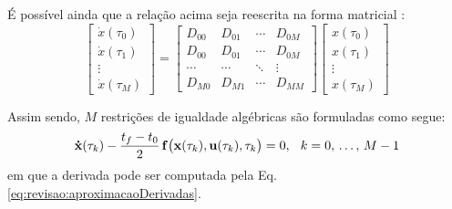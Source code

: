 É possível ainda que a relação acima seja reescrita na forma matricial \cite{becerra_tutorial_2010}:
%
\begin{equation}
	\begin{bmatrix}
		\dot{x}(\tau_0) \\
		\dot{x}(\tau_1) \\
		\vdots \\
		\dot{x}(\tau_M) 
	\end{bmatrix} = 
	\begin{bmatrix}
		D_{00} & D_{01} & \cdots & D_{0M} \\
		D_{00} & D_{01} & \cdots & D_{0M} \\
		\cdots & \cdots & \ddots & \vdots \\
		D_{M0} & D_{M1} & \cdots & D_{MM} 
	\end{bmatrix}
	\begin{bmatrix}
		x(\tau_0) \\
		x(\tau_1) \\
		\vdots \\
		x(\tau_M) 
	\end{bmatrix}
\end{equation}

Assim sendo, $ M $ restrições de igualdade algébricas são formuladas como segue:
%
\begin{equation}
\mathbf{\dot{x}}(\tau_k) - \frac{t_f - t_0}{2} \, \mathbf{f} \big( \mathbf{x}(\tau_k), \mathbf{u}(\tau_k), \tau_k \big) = 0, \hspace{0.25cm} k = 0, \, \dots, \, M-1
\end{equation}
%
em que a derivada pode ser computada pela Eq. \eqref{eq:revisao:aproximacaoDerivadas}.

